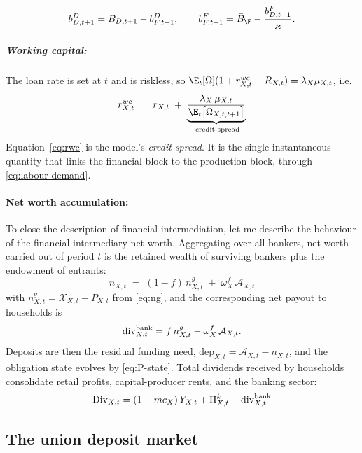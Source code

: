 \begin{equation}
b^{D}_{D,t+1}=B_{D,t+1}-b^{D}_{F,t+1},
\qquad
b^{F}_{F,t+1}=\bar B_\F-\frac{b^{F}_{D,t+1}}{\varkappa}.
\label{eq:bond-clearing}
\end{equation}
\subparagraph{Working capital:} The loan rate is set at $t$ and is riskless, so
$\E_t[\Omega](1+r^{wc}_{X,t}-R_{X,t})=\lambda_X\mu_{X,t}$, i.e.
\begin{equation}
\;
r^{wc}_{X,t}\;=\;r_{X,t}\;+\;\underbrace{\frac{\lambda_X\,\mu_{X,t}}
                                               {\E_t\bigl[\Omega_{X,t,t+1}\bigr]}}
                                        _{\text{ credit spread}}\;
\label{eq:rwc}
\end{equation}
Equation~\eqref{eq:rwc} is the model's \emph{credit spread}. It is the single instantaneous quantity that links the financial block to the production block, through \eqref{eq:labour-demand}.

\paragraph{Net worth accumulation:}
To close the description of financial intermediation, let me describe the behaviour of the financial intermediary net worth. Aggregating over all bankers, net worth carried out of period $t$ is the retained wealth
of surviving bankers plus the endowment of entrants:
\begin{equation}
\;n_{X,t}\;=\;(1-f)\,n^{g}_{X,t}\;+\;\omega_X^f\,\mathcal{A}_{X,t}\;
\label{eq:nw-lom}
\end{equation}
with $n^{g}_{X,t}=\mathcal{X}_{X,t}-P_{X,t}$ from \eqref{eq:ng}, and the corresponding
net payout to households is
\begin{equation}
\mathrm{div}^{\rm bank}_{X,t}=f\,n^{g}_{X,t}-\omega^f_X\,\mathcal{A}_{X,t}.
\label{eq:bank-div}
\end{equation}
Deposits are then the residual funding need, $\mathrm{dep}_{X,t}=\mathcal{A}_{X,t}-n_{X,t}$,
and the obligation state evolves by \eqref{eq:P-state}. Total dividends received by
households consolidate retail profits, capital-producer rents, and the banking sector:
\begin{equation}
\mathrm{Div}_{X,t}=(1-mc_X)\,Y_{X,t}+\Pi^{k}_{X,t}+\mathrm{div}^{\rm bank}_{X,t}
\label{eq:dividends}
\end{equation}

\subsection{The union deposit market}
\label{sec:union-deposits}

